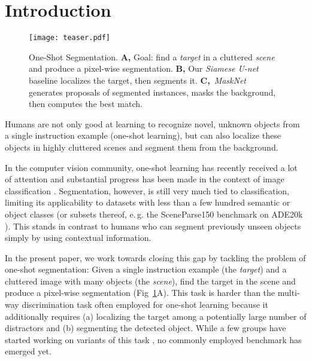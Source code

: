 \documentclass{article}
\begin{document}
\section{Introduction}
\label{introduction}

\begin{figure}[t]
\begin{center}
\centerline{\texttt{[image: teaser.pdf]}}
\caption{One-Shot Segmentation.
\textbf{A,} Goal: find a {\it target} in a cluttered {\it scene} and produce a pixel-wise segmentation. 
\textbf{B,} Our {\it Siamese U-net} baseline localizes the target, then segments it.
\textbf{C,}~{\it MaskNet} generates proposals of segmented instances, masks the background, then computes the best match.
}
\label{fig:teaser}
\end{center}
\vskip -0.2in
\end{figure}

Humans are not only good at learning to recognize novel, unknown objects from a single instruction example (one-shot learning), but can also localize these objects in highly cluttered scenes and segment them from the background. 

In the computer vision community, one-shot learning has recently received a lot of attention and substantial progress has been made in the context of image classification \cite{Koch2015a, Lake2015, Vinyals2016, Bertinetto2016, Snell2017,Triantafillou2017a, Shyam2017}.
Segmentation, however, is still very much tied to classification, limiting its applicability to datasets with less than a few hundred semantic or object classes (or subsets thereof, e.\,g. the SceneParse150
benchmark on ADE20k \cite{Zhou2017b}).
This stands in contrast to humans who can segment previously unseen objects simply by using contextual information.

In the present paper, we work towards closing this gap by tackling the problem of one-shot segmentation: 
Given a single instruction example (the {\it target}) and a cluttered image with many objects (the {\it scene}), find the target in the scene and produce a pixel-wise segmentation (Fig~\ref{fig:teaser}A).
This task is harder than the multi-way discrimination task often employed for one-shot learning because it additionally requires (a) localizing the target among a potentially large number of distractors and (b) segmenting the detected object.
While a few groups have started working on variants of this task \cite{Caelles2017, Shaban2017a}, no commonly employed benchmark has emerged yet.
\end{document}
